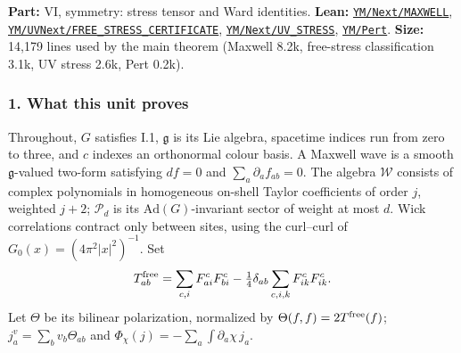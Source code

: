 \documentclass[
  letterpaper,
  11pt]{article}
\begin{document}
\textbf{Part:} VI, symmetry: stress tensor and Ward identities.
\textbf{Lean:}
\href{https://github.com/yang-mills-group/OpenAI-YM-20261028/tree/3456e5e75cf8d4cd558955a5c7638fba2d68f464/YM/Next/MAXWELL}{\texttt{YM/Next/MAXWELL}},
\href{https://github.com/yang-mills-group/OpenAI-YM-20261028/tree/3456e5e75cf8d4cd558955a5c7638fba2d68f464/YM/UVNext/FREE_STRESS_CERTIFICATE}{\texttt{YM/UVNext/FREE\_STRESS\_CERTIFICATE}},
\href{https://github.com/yang-mills-group/OpenAI-YM-20261028/tree/3456e5e75cf8d4cd558955a5c7638fba2d68f464/YM/Next/UV_STRESS}{\texttt{YM/Next/UV\_STRESS}},
\href{https://github.com/yang-mills-group/OpenAI-YM-20261028/tree/3456e5e75cf8d4cd558955a5c7638fba2d68f464/YM/Pert}{\texttt{YM/Pert}}.
\textbf{Size:} 14,179 lines used by the main theorem (Maxwell 8.2k,
free-stress classification 3.1k, UV stress 2.6k, Pert 0.2k).

\subsubsection{1. What this unit proves}\label{what-this-unit-proves-24}

Throughout, \(G\) satisfies I.1, \(\mathfrak g\) is its Lie algebra,
spacetime indices run from zero to three, and \(c\) indexes an
orthonormal colour basis. A Maxwell wave is a smooth
\(\mathfrak g\)-valued two-form satisfying \(df=0\) and
\(\sum_a\partial_af_{ab}=0\). The algebra \(\mathcal W\) consists of
complex polynomials in homogeneous on-shell Taylor coefficients of order
\(j\), weighted \(j+2\); \(\mathcal P_d\) is its
\(\mathrm{Ad}(G)\)-invariant sector of weight at most \(d\). Wick
correlations contract only between sites, using the curl--curl of
\(G_0(x)=(4\pi^2|x|^2)^{-1}\). Set
\[T^{\rm free}_{ab}=\sum_{c,i}F^c_{ai}F^c_{bi}-\tfrac14\delta_{ab}\sum_{c,i,k}F^c_{ik}F^c_{ik}.\]
Let \(\Theta\) be its bilinear polarization, normalized by
\(\Theta(f,f)=2T^{\rm free}(f)\); \(j^v_a=\sum_bv_b\Theta_{ab}\) and
\(\Phi_\chi(j)=-\sum_a\int\partial_a\chi\,j_a\).
\end{document}
